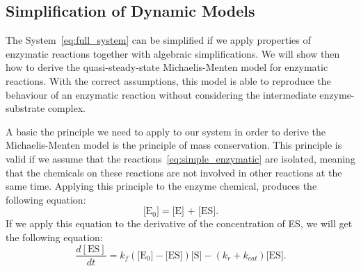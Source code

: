 \subsection{Simplification of Dynamic Models}
The System~\ref{eq:full_system} can be simplified if we
apply properties of enzymatic reactions together with algebraic 
simplifications. We will show then how to derive the quasi-steady-state 
Michaelis-Menten model for enzymatic reactions. With the correct 
assumptions, this model is able to reproduce the behaviour of an 
enzymatic reaction without considering the intermediate enzyme-substrate 
complex.

A basic the principle we need to apply to our system in order to derive
the Michaelis-Menten model is the principle of mass conservation. This 
principle is valid if we assume that the 
reactions~\ref{eq:simple_enzymatic} are isolated, meaning that the 
chemicals on these reactions are not involved in other reactions at the
same time. Applying this principle to the enzyme chemical, produces the
following equation:
\begin{equation*}
    \text{[E$_0$]} = \text{[E] + [ES]}.
    \label{eq:E_conservation}
\end{equation*}
If we apply this equation to the derivative of the concentration of ES,
we will get the following equation:
\begin{equation}
    \frac{d[\text{ES}]}{dt} =  
        k_f(\text{[E$_0$]} - \text{[ES]})\text{[S]} 
        - (k_r + k_{cat}) \text{[ES]}. 
        \label{eq:dESdt_2}
\end{equation}

